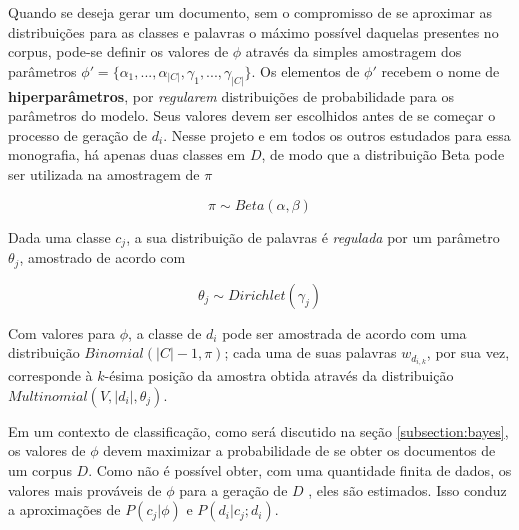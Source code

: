 Quando se deseja gerar um documento, sem o compromisso de se aproximar as distribuições para as classes e palavras o máximo possível daquelas presentes no corpus, pode-se definir os valores de \ensuremath{\phi} através da simples amostragem dos parâmetros \ensuremath{\phi' = \{\alpha_{1}, ..., \alpha_{|C|}, \gamma_1, ..., \gamma_{|C|}\}}. Os elementos de \ensuremath{\phi'} recebem o nome de \textbf{hiperparâmetros}, por \emph{regularem} distribuições de probabilidade para os parâmetros do modelo. Seus valores devem ser escolhidos antes de se começar o processo de geração de \ensuremath{d_i}. Nesse projeto e em todos os outros estudados para essa monografia, há apenas duas classes em \ensuremath{D}, de modo que a distribuição Beta pode ser utilizada na amostragem de \ensuremath{\pi}

\begin{equation}
\label{theta_c}
  \ensuremath{\pi \sim Beta(\alpha, \beta)}  
\end{equation}

Dada uma classe \ensuremath{c_j}, a sua distribuição de palavras é \emph{regulada} por um parâmetro \ensuremath{\theta_j}, amostrado de acordo com

\begin{equation}
\label{theta_j}
  \ensuremath{\theta_j \sim Dirichlet(\gamma_j)}
\end{equation}

Com valores para \ensuremath{\phi}, a classe de \ensuremath{d_i} pode ser amostrada de acordo com uma distribuição \ensuremath{Binomial(|C| - 1, \pi)}; cada uma de suas palavras \ensuremath{w_{d_{i,k}}}, por sua vez, corresponde à \ensuremath{k}-ésima posição da amostra obtida através da distribuição \ensuremath{Multinomial(V, |d_i|, \theta_j)}.

Em um contexto de classificação, como será discutido na seção \ref{subsection:bayes}, os valores de \ensuremath{\phi} devem maximizar a probabilidade de se obter os documentos de um corpus \ensuremath{D}. Como não é possível obter, com uma quantidade finita de dados, os valores mais prováveis de  \ensuremath{\phi} para a geração de \ensuremath{D} \cite{nigam}, eles são estimados. Isso conduz a aproximações de \ensuremath{P(c_j | \phi)} e \ensuremath{P(d_i | c_j ; d_i)}.






